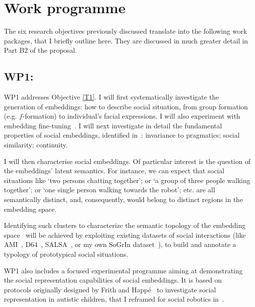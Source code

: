 
\section{Work programme}


The six research objectives previously discussed translate into the following
work packages, that I briefly outline here. They are discussed in much greater detail in Part B2 of the proposal.

\subsection{WP1: \textbf{\wpOne}}

WP1 addresses Objective \ref{T1}. I will first systematically investigate the
generation of embeddings: how to describe social situation, from group formation
(e.g. $f$-formation) to individual's facial expressions. I will also experiment
with embedding fine-tuning~\cite{hadsell2006dimensionality}. I will next
investigate in detail the fundamental properties of social embeddings,
identified in~\cite{lemaignan2024social}: invariance to pragmatics; social
similarity; continuity.

I will then characterise social embeddings. Of particular interest is the question of the embeddings' latent semantics. For
instance, we can expect that social situations like `two persons chatting
together'; or `a group of three people walking together'; or `one single person
walking towards the robot'; etc. are all semantically distinct, and,
consequently, would belong to distinct regions in the embedding space.

Identifying such clusters to characterize the semantic topology of the embedding
space~\cite{sun2023topological} will be achieved by exploiting existing datasets
of social interactions (like AMI~\cite{carletta2007ami},
D64~\cite{oertel2013d64}, SALSA~\cite{alameda2015salsa}, or my own SoGrIn
dataset~\cite{webb2023sogrin}), to build and annotate a typology of prototypical
social situations.

WP1 also includes a focused experimental programme aiming at demonstrating the
social representation capabilities of social embeddings. It is based on
protocols originally designed by Frith and Happé~\cite{frith1994autism} to
investigate social representation in autistic children, that I reframed for
social robotics in~\cite{lemaignan2015mutual}.

